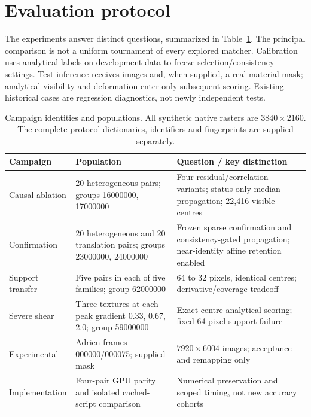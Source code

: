\section{Evaluation protocol}
The experiments answer distinct questions, summarized in Table~\ref{tab:campaigns}. The principal comparison is not a uniform tournament of every explored matcher. Calibration uses analytical labels on development data to freeze selection/consistency settings. Test inference receives images and, when supplied, a real material mask; analytical visibility and deformation enter only subsequent scoring. Existing historical cases are regression diagnostics, not newly independent tests.

\begin{table}[tb]\centering\small
\caption{Campaign identities and populations. All synthetic native rasters are $3840\times2160$. The complete protocol dictionaries, identifiers and fingerprints are supplied separately.}\label{tab:campaigns}
\begin{tabular}{p{.22\linewidth}p{.24\linewidth}p{.42\linewidth}}\toprule
Campaign & Population & Question / key distinction\\\midrule
Causal ablation & 20 heterogeneous pairs; groups 16000000, 17000000 & Four residual/correlation variants; status-only median propagation; 22,416 visible centres\\
Confirmation & 20 heterogeneous and 20 translation pairs; groups 23000000, 24000000 & Frozen sparse confirmation and consistency-gated propagation; near-identity affine retention enabled\\
Support transfer & Five pairs in each of five families; group 62000000 & 64 to 32 pixels, identical centres; derivative/coverage tradeoff\\
Severe shear & Three textures at each peak gradient 0.33, 0.67, 2.0; group 59000000 & Exact-centre analytical scoring; fixed 64-pixel support failure\\
Experimental & Adrien frames 000000/000075; supplied mask & $7920\times6004$ images; acceptance and remapping only\\
Implementation & Four-pair GPU parity and isolated cached-script comparison & Numerical preservation and scoped timing, not new accuracy cohorts\\\bottomrule
\end{tabular}\end{table}

